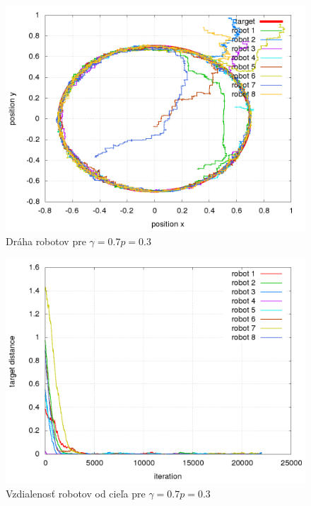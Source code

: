 \begin{figure}[!htb]
\centering
\includegraphics[scale=.4]{../../results_q_learning/nano_q_learning/result_03/robot_path.png}
\caption{Dráha robotov pre $\gamma = 0.7 p = 0.3$}
\label{img:nano_q_result_03_path}
\end{figure}

\begin{figure}[!htb]
\centering
\includegraphics[scale=.4]{../../results_q_learning/nano_q_learning/result_03/robot_reward.png}
\caption{Vzdialenosť robotov od cieľa pre $\gamma = 0.7 p = 0.3$}
\label{img:nano_q_result_03_error}
\end{figure}



